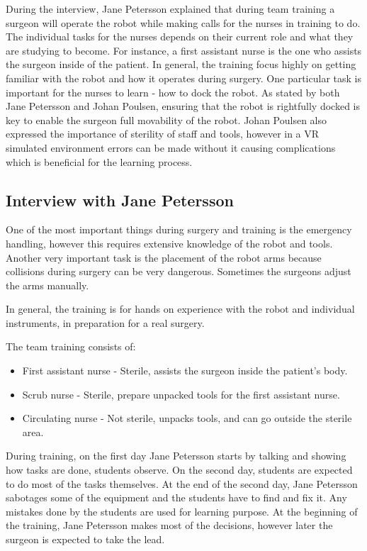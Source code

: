 \documentclass[paper=a4, fontsize=11pt]{scrartcl} %
\numberwithin{equation}{section} %
\numberwithin{figure}{section} %
\numberwithin{table}{section} %
\begin{document}
During the interview, Jane Petersson explained that during team training a surgeon will operate the robot while making calls for the nurses in training to do. The individual tasks for the nurses depends on their current role and what they are studying to become. For instance, a first assistant nurse is the one who assists the surgeon inside of the patient. In general, the training focus highly on getting familiar with the robot and how it operates during surgery. One particular task is important for the nurses to learn - how to dock the robot. As stated by both Jane Petersson and Johan Poulsen, ensuring that the robot is rightfully docked is key to enable the surgeon full movability of the robot. Johan Poulsen also expressed the importance of sterility of staff and tools, however in a VR simulated environment errors can be made without it causing complications which is beneficial for the learning process.

\subsection{Interview with Jane Petersson}
One of the most important things during surgery and training is the emergency handling, however this requires extensive knowledge of the robot and tools. Another very important task is the placement of the robot arms because collisions during surgery can be very dangerous. Sometimes the surgeons adjust the arms manually.

In general, the training is for hands on experience with the robot and individual instruments, in preparation for a real surgery.

The team training consists of:
\begin{itemize}
  \item First assistant nurse - Sterile, assists the surgeon inside the patient's body.
  \item Scrub nurse - Sterile, prepare unpacked tools for the first assistant nurse.
  \item Circulating nurse - Not sterile, unpacks tools, and can go outside the sterile area.
\end{itemize}  

During training, on the first day Jane Petersson starts by talking and showing how tasks are done, students observe. On the second day, students are expected to do most of the tasks themselves. At the end of the second day, Jane Petersson sabotages some of the equipment and the students have to find and fix it. Any mistakes done by the students are used for learning purpose. At the beginning of the training, Jane Petersson makes most of the decisions, however later the surgeon is expected to take the lead.
\end{document}
